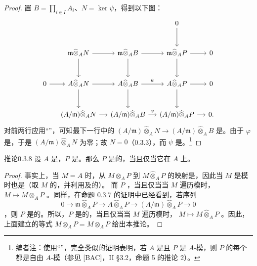 \begin{proof}
置 $B=\prod_{i\in I}A_i$、$N=\ker\psi$，得到以下图：
\[
\begin{tikzcd}[column sep=small,row sep=large]
 &&&0\arrow[d]\\
 &\mathfrak m\widehat\otimes_A N\arrow[r]\arrow[d]&\mathfrak m\widehat\otimes_A B\arrow[r]\arrow[d]&\mathfrak m\widehat\otimes_A P\arrow[r]\arrow[d]&0\\
0\arrow[r]&A\widehat\otimes_A N\arrow[r]\arrow[d]&A\widehat\otimes_A B\arrow[r,"\psi"]\arrow[d]&A\widehat\otimes_A P\arrow[r]\arrow[d]&0\\
 &(A/\mathfrak m)\widehat\otimes_A N\arrow[r]&(A/\mathfrak m)\widehat\otimes_A B\arrow[r,"\varphi"]&(A/\mathfrak m)\widehat\otimes_A P\arrow[r]&0.
\end{tikzcd}
\]
对前两行应用“”，可知最下一行中的 $(A/\mathfrak m)\widehat\otimes_A N\to(A/\mathfrak m)\widehat\otimes_A B$ 是。由于 $\varphi$ 是，于是 $(A/\mathfrak m)\widehat\otimes_A N$ 为零；故 $N=0$（0.3.3），而 $\psi$ 是。\footnote{编者注：使用“”，完全类似的证明表明，若 $A$ 是且 $P$ 是 $A$-模，则 $P$ 的每个都是自由 $A$-模（参见 [BAC]，II \S 3.2，命题 5 的推论 2）。}
\end{proof}

\begin{SGAresult}{推论}{0.3.8}
设 $A$ 是，$P$ 是。那么 $P$ 是的，当且仅当它在 $A$ 上。
\end{SGAresult}
\begin{proof}
事实上，当 $M=A$ 时，从 $M\otimes_A P$ 到 $M\widehat\otimes_A P$ 的映射是，因此当 $M$ 是模时也是（取 $M$ 的，并利用及的）。
而 $P$ ，当且仅当当 $M$ 遍历模时， $M\mapsto M\otimes_A P$ 。同样，在命题 0.3.7 的证明中已经看到，若序列
\[0\longrightarrow\mathfrak m\widehat\otimes_A P\longrightarrow A\widehat\otimes_A P\longrightarrow(A/\mathfrak m)\widehat\otimes_A P\longrightarrow0\]
，则 $P$ 是的。所以，$P$ 是的，当且仅当当 $M$ 遍历模时， $M\mapsto M\widehat\otimes_A P$ 。因此，上面建立的等式 $M\otimes_A P=M\widehat\otimes_A P$ 给出本推论。
\end{proof}

